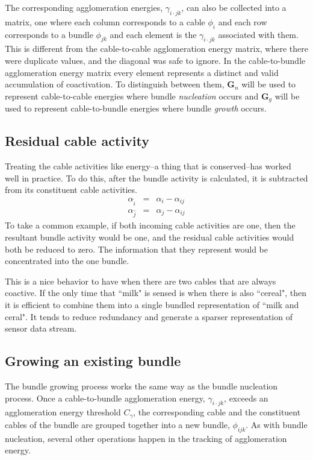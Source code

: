 The corresponding agglomeration energies, $\gamma_{i\cdot jk}$,
can also be collected
into a matrix, one where each column corresponds to a cable $\phi_i$
and each row corresponds to a bundle $\phi_{jk}$ and each element is
the $\gamma_{i \cdot jk}$ associated with them. This is different from the
cable-to-cable agglomeration energy matrix, where there were duplicate
values, and the diagonal was safe to ignore. In the cable-to-bundle
agglomeration energy matrix every element represents a distinct and valid
accumulation of coactivation. To distinguish between them,
$\mathbf{G}_n$ will be used to represent cable-to-cable energies where
bundle \textit{nucleation} occurs and $\mathbf{G}_g$ will be used to
represent cable-to-bundle energies where bundle \textit{growth} occurs.

\subsection{Residual cable activity}
\label{subsec:algoresidual}

Treating the cable activities like energy--a thing that is conserved--has
worked well in practice. To do this, after the bundle activity is
calculated, it is subtracted from its constituent cable activities.
\begin{eqnarray}
\alpha_{\hat{i}} &=& \alpha_i - \alpha_{ij}\\
\alpha_{\hat{j}} &=& \alpha_j - \alpha_{ij}
\end{eqnarray}
To take a common example, if both incoming cable activities are one,
then the resultant bundle activity would be one, and the residual cable
activities would both be reduced to zero. The information that they
represent would be concentrated into the one bundle.

This is a nice behavior to have when there are two cables
that are always coactive. If the only time that ``milk" is sensed is when
there is also ``cereal", then it is efficient to combine them into
a single bundled representation of ``milk and ceral". It tends to
reduce redundancy and generate a sparser representation of sensor data
stream.

\subsection{Growing an existing bundle}
\label{subsec:algogrowing}

The bundle growing process works the same way as the bundle nucleation
process. Once a cable-to-bundle agglomeration energy, $\gamma_{i \cdot jk}$,
exceeds an agglomeration energy threshold $C_\gamma$, the corresponding
cable and the constituent cables of the bundle are grouped together into
a new bundle, $\phi_{ijk}$. As with bundle nucleation, several other
operations happen in the tracking of agglomeration energy.

